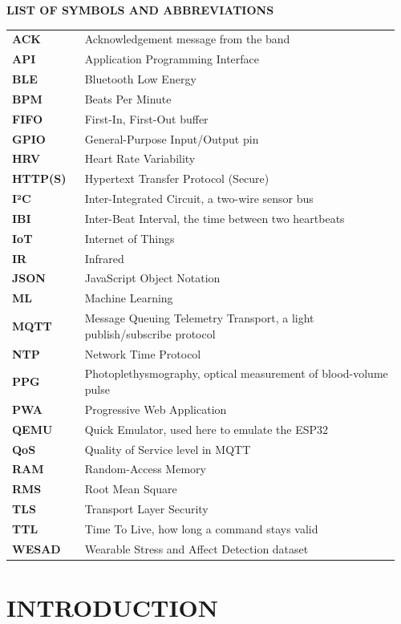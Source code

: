 \documentclass[12pt,letterpaper,oneside]{report}
\newcommand{\fronttitle}[1]{\begin{center}{\bfseries\fontsize{16}{22}\selectfont #1}\end{center}\vspace{10pt}}
\begin{document}
\clearpage
\fronttitle{LIST OF SYMBOLS AND ABBREVIATIONS}\label{abbr}
\begin{tabular}{@{}p{0.18\linewidth}p{0.78\linewidth}@{}}
\textbf{ACK} & Acknowledgement message from the band \\
\textbf{API} & Application Programming Interface \\
\textbf{BLE} & Bluetooth Low Energy \\
\textbf{BPM} & Beats Per Minute \\
\textbf{FIFO} & First-In, First-Out buffer \\
\textbf{GPIO} & General-Purpose Input/Output pin \\
\textbf{HRV} & Heart Rate Variability \\
\textbf{HTTP(S)} & Hypertext Transfer Protocol (Secure) \\
\textbf{I²C} & Inter-Integrated Circuit, a two-wire sensor bus \\
\textbf{IBI} & Inter-Beat Interval, the time between two heartbeats \\
\textbf{IoT} & Internet of Things \\
\textbf{IR} & Infrared \\
\textbf{JSON} & JavaScript Object Notation \\
\textbf{ML} & Machine Learning \\
\textbf{MQTT} & Message Queuing Telemetry Transport, a light publish/subscribe protocol \\
\textbf{NTP} & Network Time Protocol \\
\textbf{PPG} & Photoplethysmography, optical measurement of blood-volume pulse \\
\textbf{PWA} & Progressive Web Application \\
\textbf{QEMU} & Quick Emulator, used here to emulate the ESP32 \\
\textbf{QoS} & Quality of Service level in MQTT \\
\textbf{RAM} & Random-Access Memory \\
\textbf{RMS} & Root Mean Square \\
\textbf{TLS} & Transport Layer Security \\
\textbf{TTL} & Time To Live, how long a command stays valid \\
\textbf{WESAD} & Wearable Stress and Affect Detection dataset \\
\end{tabular}
\clearpage
{}

\chapter{INTRODUCTION}\label{ch:1}
\end{document}
